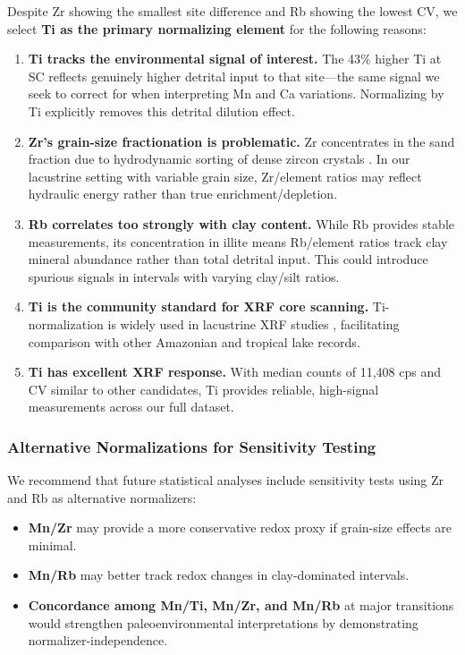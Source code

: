 Despite Zr showing the smallest site difference and Rb showing the lowest CV, we select \textbf{Ti as the primary normalizing element} for the following reasons:

\begin{enumerate}
\item \textbf{Ti tracks the environmental signal of interest.} The 43\% higher Ti at SC reflects genuinely higher detrital input to that site---the same signal we seek to correct for when interpreting Mn and Ca variations. Normalizing by Ti explicitly removes this detrital dilution effect.

\item \textbf{Zr's grain-size fractionation is problematic.} Zr concentrates in the sand fraction due to hydrodynamic sorting of dense zircon crystals \citep{Kryc2003}. In our lacustrine setting with variable grain size, Zr/element ratios may reflect hydraulic energy rather than true enrichment/depletion.

\item \textbf{Rb correlates too strongly with clay content.} While Rb provides stable measurements, its concentration in illite means Rb/element ratios track clay mineral abundance rather than total detrital input. This could introduce spurious signals in intervals with varying clay/silt ratios.

\item \textbf{Ti is the community standard for XRF core scanning.} Ti-normalization is widely used in lacustrine XRF studies \citep{Lowemark2011, Davies2015}, facilitating comparison with other Amazonian and tropical lake records.

\item \textbf{Ti has excellent XRF response.} With median counts of 11,408 cps and CV similar to other candidates, Ti provides reliable, high-signal measurements across our full dataset.
\end{enumerate}

\subsubsection{Alternative Normalizations for Sensitivity Testing}

We recommend that future statistical analyses include sensitivity tests using Zr and Rb as alternative normalizers:

\begin{itemize}
\item \textbf{Mn/Zr} may provide a more conservative redox proxy if grain-size effects are minimal.
\item \textbf{Mn/Rb} may better track redox changes in clay-dominated intervals.
\item \textbf{Concordance among Mn/Ti, Mn/Zr, and Mn/Rb} at major transitions would strengthen paleoenvironmental interpretations by demonstrating normalizer-independence.
\end{itemize}

